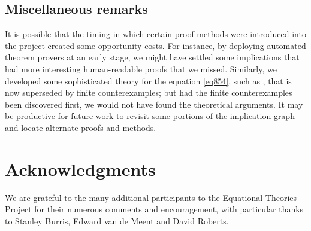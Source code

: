 \subsection{Miscellaneous remarks}

It is possible that the timing in which certain proof methods were introduced into the project created some opportunity costs.  For instance, by deploying automated theorem provers at an early stage, we might have settled some implications that had more interesting human-readable proofs that we missed.  Similarly, we developed some sophisticated theory for the equation \eqref{eq854}, such as , that is now superseded by finite counterexamples; but had the finite counterexamples been discovered first, we would not have found the theoretical arguments.  It may be productive for future work to revisit some portions of the implication graph and locate alternate proofs and methods.


\section*{Acknowledgments}

We are grateful to the many additional participants to the Equational Theories Project for their
numerous comments and encouragement, with particular thanks to  Stanley Burris, Edward van de Meent and David Roberts.
